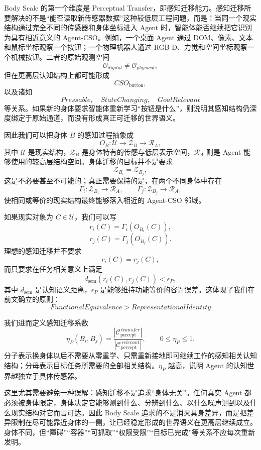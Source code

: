 Body Scale 的第一个维度是 Perceptual Transfer，即感知迁移能力。感知迁移所要解决的不是“能否读取新传感器数据”这种较低层工程问题，而是：当同一个现实结构通过完全不同的传感器和身体坐标进入 Agent 时，智能体能否继续把它识别为具有相近意义的 Agent-CSO。例如，一个桌面 Agent 通过 DOM、像素、文本和鼠标坐标观察一个按钮；一个物理机器人通过 RGB-D、力觉和空间坐标观察一个机械按钮。二者的原始观测空间
\[
\mathcal O_{digital}
\neq
\mathcal O_{physical},
\]
但在更高层认知结构上都可能形成
\[
CSO_{\text{button}},
\]
以及诸如
\[
Pressable,\quad StateChanging,\quad GoalRelevant
\]
等关系。如果新的身体要求智能体重新学习“按钮是什么”，则说明其感知结构仍深度绑定于原始通道，而没有形成真正可迁移的世界语义。

因此我们可以把身体 $B$ 的感知过程抽象成
\[
O_B:
\mathcal U
\rightarrow
\mathcal Z_B
\rightarrow
\mathcal R_A,
\]
其中 $\mathcal U$ 是现实结构，$\mathcal Z_B$ 是身体特有的传感与低层表示空间，$\mathcal R_A$ 则是 Agent 能够使用的较高层结构空间。身体迁移的目标并不是要求
\[
\mathcal Z_{B_i}
=
\mathcal Z_{B_j},
\]
这是不必要甚至不可能的；真正需要保持的是，在两个不同身体中存在
\[
\Gamma_i:\mathcal Z_{B_i}\rightarrow\mathcal R_A,
\qquad
\Gamma_j:\mathcal Z_{B_j}\rightarrow\mathcal R_A,
\]
使相同或等价的现实结构最终能够落入相近的 Agent-CSO 邻域。

如果现实对象为 $C\in\mathcal U$，我们可以写
\[
r_i(C)
=
\Gamma_i(O_{B_i}(C)),
\]
\[
r_j(C)
=
\Gamma_j(O_{B_j}(C)).
\]
理想的感知迁移并不要求
\[
r_i(C)=r_j(C),
\]
而只要求在任务相关意义上满足
\[
d_{\mathrm{sem}}
\left(
r_i(C),
r_j(C)
\right)
<
\epsilon_P,
\]
其中 $d_{\mathrm{sem}}$ 是认知语义距离，$\epsilon_P$ 是能够维持功能等价的容许误差。这体现了我们在前文确立的原则：
\[
\boxed{
FunctionalEquivalence
>
RepresentationalIdentity
}
\]

我们进而定义感知迁移系数
\[
\eta_P(B_i,B_j)
=
\frac{
\left|
\mathcal C_{\mathrm{percept}}^{\,transfer}
\right|
}{
\left|
\mathcal C_{\mathrm{percept}}^{\,relevant}
\right|
},
\qquad
0\leq \eta_P\leq 1.
\]
分子表示换身体以后不需要从零重学、只需重新接地即可继续工作的感知相关认知结构；分母表示目标任务所需要的全部相关结构。$\eta_P$ 越高，说明 Agent 的认知世界越独立于具体传感器。

这里尤其需要避免一种误解：感知迁移不是追求“身体无关”。任何真实 Agent 都必须被身体限定，身体决定它能够测到什么、分辨到什么、以什么噪声测到以及什么现实结构对它而言可达。因此 Body Scale 追求的不是消灭具身差异，而是把差异限制在尽可能靠近身体的一侧，让已经稳定形成的世界语义在更高层继续成立。身体不同，但“障碍”“容器”“可抓取”“权限受限”“目标已完成”等关系不应每次重新发明。

